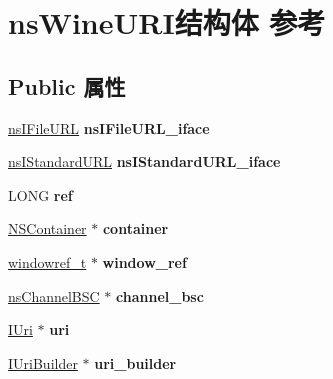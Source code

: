 \hypertarget{structns_wine_u_r_i}{}\section{ns\+Wine\+U\+R\+I结构体 参考}
\label{structns_wine_u_r_i}
\subsection*{Public 属性}
\begin{DoxyCompactItemize}
\item 
\mbox{\label{structns_wine_u_r_i_a028793c0781538e0c2c42a81b46cca4e}} 
\hyperlink{interfacens_i_file_u_r_l}{ns\+I\+File\+U\+RL} {\bfseries ns\+I\+File\+U\+R\+L\+\_\+iface}
\item 
\mbox{\label{structns_wine_u_r_i_ad69dd493dd107221379e468abf6c4d30}} 
\hyperlink{interfacens_i_standard_u_r_l}{ns\+I\+Standard\+U\+RL} {\bfseries ns\+I\+Standard\+U\+R\+L\+\_\+iface}
\item 
\mbox{\label{structns_wine_u_r_i_aad5eef0ad3b52803aef96dc5a4ff4065}} 
L\+O\+NG {\bfseries ref}
\item 
\mbox{\label{structns_wine_u_r_i_a71dc7c2f2cbeeb17d5f15a975eec9ac1}} 
\hyperlink{struct_n_s_container}{N\+S\+Container} $\ast$ {\bfseries container}
\item 
\mbox{\label{structns_wine_u_r_i_a9b7613e0cbbbe1646d11a0f6ab2ed39e}} 
\hyperlink{structwindowref__t}{windowref\+\_\+t} $\ast$ {\bfseries window\+\_\+ref}
\item 
\mbox{\label{structns_wine_u_r_i_a17a740aff3e375fc85570c144e756825}} 
\hyperlink{structns_channel_b_s_c}{ns\+Channel\+B\+SC} $\ast$ {\bfseries channel\+\_\+bsc}
\item 
\mbox{\label{structns_wine_u_r_i_ad899f6763fda479489e7a48e283d857a}} 
\hyperlink{interface_i_uri}{I\+Uri} $\ast$ {\bfseries uri}
\item 
\mbox{\label{structns_wine_u_r_i_a9532651f738aefe8bab521e7dac59db5}} 
\hyperlink{interface_i_uri_builder}{I\+Uri\+Builder} $\ast$ {\bfseries uri\+\_\+builder}

\end{DoxyCompactItemize}
